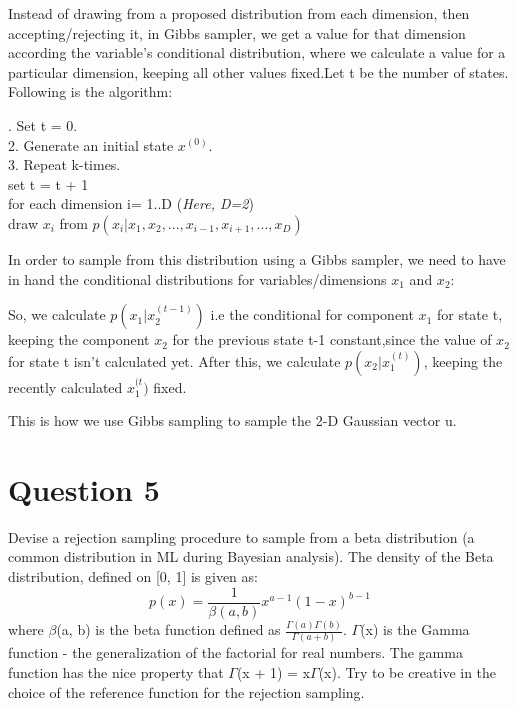 \documentclass[12pt,a4paper]{article}
\begin{document}
Instead of drawing from a proposed distribution from each dimension, then accepting/rejecting it, in Gibbs sampler, we get a value for that dimension according the variable's conditional distribution, where we calculate a value for a particular dimension, keeping all other values fixed.Let t be the number of states. Following is the algorithm:

\begin{algorithm}[H]
. Set t = 0.\\
 2. Generate an initial state $x^{(0)}$.\\
 3. Repeat k-times. \\
\tab set t = t + 1\\
\tab for each dimension i= 1..D  (\textit{Here, D=2})\\
\tab draw $x_i$ from $p(x_i|x_1,x_2,...,x_{i-1},x_{i+1},...,x_D)$

\end{algorithm}

In order to sample from this distribution using a Gibbs sampler, we need to have in hand the conditional distributions for variables/dimensions $x_1$ and $x_2$:

So, we calculate $p(x_1|x_2^{(t-1)})$ i.e the conditional for component $x_1$ for state t, keeping the component $x_2$ for the previous state t-1 constant,since the value of $x_2$ for state t isn't calculated yet. After this, we calculate $p(x_2|x_1^{(t)})$, keeping the recently calculated $x_1^{(t})$ fixed. 

This is how we use Gibbs sampling to sample the 2-D Gaussian vector u.
\section{Question 5}
Devise a rejection sampling procedure to sample from a beta distribution (a common distribution in ML during Bayesian analysis). The density of the Beta distribution, defined on [0, 1] is given as:
\begin{equation*}
    p(x) = \frac{1}{\beta(a,b)}x^{a-1}(1-x)^{b-1}
\end{equation*}
where $\beta$(a, b) is the beta function defined as $\frac{\Gamma(a)\Gamma(b)}{\Gamma(a+b)}$. $\Gamma$(x) is the Gamma function - the generalization of the factorial for real numbers. The gamma function has the nice property that $\Gamma$(x + 1) = x$\Gamma$(x). Try to be creative in the choice of the reference function for the rejection sampling.
\end{document}
